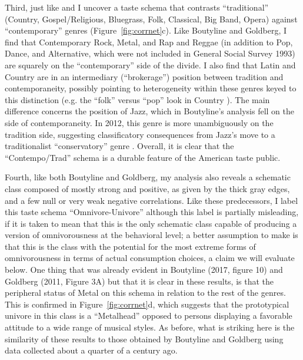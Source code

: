 \documentclass[preprint, authoryear,11pt, 3p]{elsarticle}
\begin{document}
Third, just like \citet{boutyline2017improving} and \citet{goldberg2011mapping} I uncover a taste schema that contrasts ``traditional'' (Country, Gospel/Religious, Bluegrass, Folk, Classical, Big Band, Opera) against ``contemporary'' genres (Figure~\ref{fig:corrnet}c). Like Boutyline and Goldberg, I find that Contemporary Rock, Metal, and Rap and Reggae (in addition to Pop, Dance, and Alternative, which were not included in General Social Survey 1993) are squarely on the ``contemporary'' side of the divide. I also find that Latin and Country are in an intermediary (``brokerage'') position between tradition and contemporaneity, possibly pointing to heterogeneity within these genres keyed to this distinction (e.g. the ``folk'' versus ``pop'' look in Country \citep[52]{peterson2013creating}). The main difference concerns the position of Jazz, which in Boutyline's analysis fell on the side of contemporaneity. In 2012, this genre is more unambiguously on the tradition side, suggesting classificatory consequences from Jazz's move to a traditionalist ``conservatory'' genre \citep{lena2012banding}. Overall, it is clear that the ``Contempo/Trad'' schema is a durable feature of the American taste public. 

Fourth, like both Boutyline and Goldberg, my analysis also reveals a schematic class composed of mostly strong and positive, as given by the thick gray edges, and a few null or very weak negative correlations. Like these predecessors, I label this taste schema ``Omnivore-Univore'' although this label is partially misleading, if it is taken to mean that this is the only schematic class capable of producing a version of omnivorousness at the behavioral level; a better assumption to make is that this is the class with the potential for the most extreme forms of omnivorousness in terms of actual consumption choices, a claim we will evaluate below. One thing that was already evident in Boutyline (2017, figure 10) and Goldberg (2011, Figure 3A) but that it is clear in these results, is that the peripheral status of Metal on this schema in relation to the rest of the genres. This is confirmed in Figure~\ref{fig:corrnet}d, which suggests that the prototypical univore in this class is a ``Metalhead'' opposed to persons displaying a favorable attitude to a wide range of musical styles. As before, what is striking here is the similarity of these results to those obtained by Boutyline and Goldberg using data collected about a quarter of a century ago. 
\end{document}
